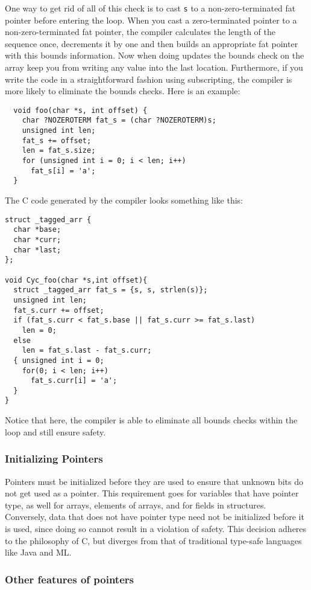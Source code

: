 One way to get rid of all of this check is to cast \texttt{s}
to a non-zero-terminated fat pointer before entering the loop.
When you cast a zero-terminated pointer to a non-zero-terminated
fat pointer, the compiler calculates the length of the sequence
once, decrements it by one and then builds an appropriate
fat pointer with this bounds information.  Now when doing 
updates the bounds check on the array keep you from writing
any value into the last location.  Furthermore, if you write
the code in a straightforward fashion using subscripting,
the compiler is more likely to eliminate the bounds checks.
Here is an example:
\begin{verbatim}
  void foo(char *s, int offset) {
    char ?NOZEROTERM fat_s = (char ?NOZEROTERM)s;
    unsigned int len; 
    fat_s += offset;
    len = fat_s.size;    
    for (unsigned int i = 0; i < len; i++)
      fat_s[i] = 'a';
  }
\end{verbatim}
The C code generated by the compiler looks something like this:      
\begin{verbatim}
struct _tagged_arr { 
  char *base;
  char *curr;
  char *last;
};

void Cyc_foo(char *s,int offset){
  struct _tagged_arr fat_s = {s, s, strlen(s)};
  unsigned int len;
  fat_s.curr += offset;
  if (fat_s.curr < fat_s.base || fat_s.curr >= fat_s.last) 
    len = 0;
  else 
    len = fat_s.last - fat_s.curr;
  { unsigned int i = 0;
    for(0; i < len; i++)
      fat_s.curr[i] = 'a';
  }
}
\end{verbatim}
Notice that here, the compiler is able to eliminate all bounds
checks within the loop and still ensure safety.

\subsubsection*{Initializing Pointers}

Pointers must be initialized before they are used to ensure that unknown
bits do not get used as a pointer.  This requirement goes for
variables that have pointer type, as well for arrays, elements of arrays,
and for fields in structures.  Conversely, data that does not have pointer
type need not be initialized before it is used, since doing so cannot result
in a violation of safety.  This decision adheres to the philosophy of C, but
diverges from that of traditional type-safe languages like Java and ML.

\subsubsection*{Other features of pointers}

